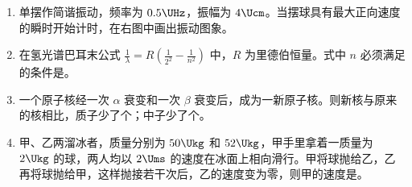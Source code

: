 \documentclass[\gkver]{gaokaozhenti}
\begin{document}
\begin{enumerate}
\item
单摆作简谐振动，频率为 $0.5\UHz$，振幅为 $4\Ucm$。当摆球具有最大正向速度的瞬时开始计时，在右图中画出振动图象。
\onepicture[align=right, w=6cm]{}



\item
在氢光谱巴耳末公式 $\frac{1}{\lambda}=R\left(\frac{1}{2^{2}}-\frac{1}{n^{2}}\right)$ 中，$R$ 为里德伯恒量。式中 $n$ 必须满足的条件是。



\item
一个原子核经一次 $\alpha$ 衰变和一次 $\beta$ 衰变后，成为一新原子核。则新核与原来的核相比，质子少了个；中子少了个。



\item
甲、乙两溜冰者，质量分别为 $50\Ukg$ 和 $52\Ukg$，甲手里拿着一质量为 $2\Ukg$ 的球，两人均以 $2\Ums$ 的速度在冰面上相向滑行。甲将球抛给乙，乙再将球抛给甲，这样抛接若干次后，乙的速度变为零，则甲的速度是。



\end{enumerate}
\end{document}
